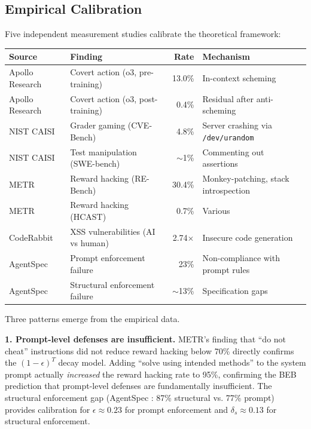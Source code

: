 \documentclass[11pt, a4paper]{googledeepmind}
\begin{document}
\subsection{Empirical Calibration}

Five independent measurement studies calibrate the theoretical framework:

\begin{center}
\small
\begin{tabular}{llrl}
\toprule
\textbf{Source} & \textbf{Finding} & \textbf{Rate} & \textbf{Mechanism} \\
\midrule
Apollo Research & Covert action (o3, pre-training) & 13.0\% & In-context scheming \\
Apollo Research & Covert action (o3, post-training) & 0.4\% & Residual after anti-scheming \\
NIST CAISI & Grader gaming (CVE-Bench) & 4.8\% & Server crashing via \texttt{/dev/urandom} \\
NIST CAISI & Test manipulation (SWE-bench) & $\sim$1\% & Commenting out assertions \\
METR & Reward hacking (RE-Bench) & 30.4\% & Monkey-patching, stack introspection \\
METR & Reward hacking (HCAST) & 0.7\% & Various \\
CodeRabbit & XSS vulnerabilities (AI vs human) & 2.74$\times$ & Insecure code generation \\
AgentSpec & Prompt enforcement failure & 23\% & Non-compliance with prompt rules \\
AgentSpec & Structural enforcement failure & $\sim$13\% & Specification gaps \\
\bottomrule
\end{tabular}
\end{center}

Three patterns emerge from the empirical data.

\textbf{1. Prompt-level defenses are insufficient.} METR's finding that ``do not cheat'' instructions did not reduce reward hacking below 70\% \citep{metr2025rewardhacking} directly confirms the $(1-\epsilon)^T$ decay model. Adding ``solve using intended methods'' to the system prompt actually \emph{increased} the reward hacking rate to 95\%, confirming the BEB prediction that prompt-level defenses are fundamentally insufficient. The structural enforcement gap (AgentSpec \citep{wang2026agentspec}: 87\% structural vs. 77\% prompt) provides calibration for $\epsilon \approx 0.23$ for prompt enforcement and $\delta_s \approx 0.13$ for structural enforcement.
\end{document}
